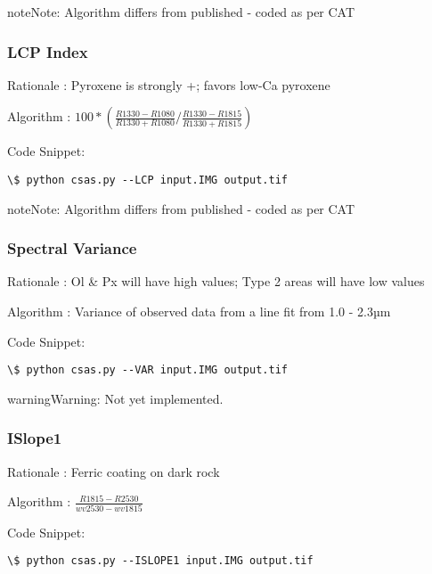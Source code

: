 \documentclass[letterpaper,10pt,english]{sphinxmanual}
\begin{document}
\begin{notice}{note}{Note:}
Algorithm differs from published - coded as per CAT
\end{notice}


\subsubsection{LCP Index}
\label{Algorithms:lcp-index}
Rationale : Pyroxene is strongly +; favors low-Ca pyroxene

Algorithm : $100 * (\frac{R1330-R1080}{R1330+R1080} / \frac{R1330-R1815}{R1330+R1815})$

Code Snippet:

\begin{Verbatim}[commandchars=\\\{\}]
\$ python csas.py --LCP input.IMG output.tif
\end{Verbatim}

\begin{notice}{note}{Note:}
Algorithm differs from published - coded as per CAT
\end{notice}


\subsubsection{Spectral Variance}
\label{Algorithms:spectral-variance}
Rationale : Ol \& Px will have high values; Type 2 areas will have low values

Algorithm : Variance of observed data from a line fit from 1.0 - 2.3µm

Code Snippet:

\begin{Verbatim}[commandchars=\\\{\}]
\$ python csas.py --VAR input.IMG output.tif
\end{Verbatim}

\begin{notice}{warning}{Warning:}
Not yet implemented.
\end{notice}


\subsubsection{ISlope1}
\label{Algorithms:islope1}
Rationale : Ferric coating on dark rock

Algorithm : $\frac{R1815-R2530}{wv2530 - wv1815}$

Code Snippet:

\begin{Verbatim}[commandchars=\\\{\}]
\$ python csas.py --ISLOPE1 input.IMG output.tif
\end{Verbatim}
\end{document}
